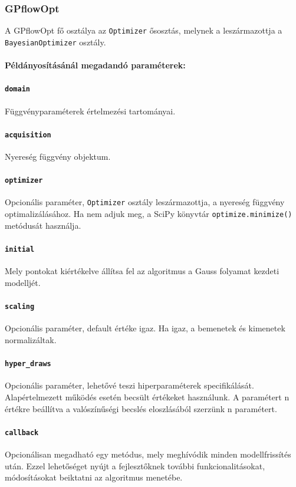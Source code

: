 \subsubsection{GPflowOpt}

A GPflowOpt fő osztálya az \texttt{Optimizer} ősosztás, melynek a leszármazottja a \texttt{BayesianOptimizer} osztály.
\paragraph{Példányosításánál megadandó paraméterek:}
\paragraph{\texttt{domain}} Függvényparaméterek értelmezési tartományai.
\paragraph{\texttt{acquisition}} Nyereség függvény objektum.
\paragraph{\texttt{optimizer}} Opcionális paraméter, \texttt{Optimizer} osztály leszármazottja, a nyereség függvény optimalizálásához. Ha nem adjuk meg, a SciPy könyvtár \texttt{optimize.minimize()} metódusát használja.
\paragraph{\texttt{initial}} Mely pontokat kiértékelve állítsa fel az algoritmus a Gauss folyamat kezdeti modelljét.
\paragraph{\texttt{scaling}} Opcionális paraméter, default értéke igaz. Ha igaz, a bemenetek és kimenetek normalizáltak.
\paragraph{\texttt{hyper\_draws}} Opcionális paraméter, lehetővé teszi hiperparaméterek specifikálását. Alapértelmezett működés esetén becsült értékeket használunk. A paramétert n értékre beállítva a valószínűségi becslés eloszlásából
szerzünk n paramétert.
\paragraph{\texttt{callback}} Opcionálisan megadható egy metódus, mely meghívódik minden modellfrissítés után. Ezzel lehetőséget nyújt a fejlesztőknek további funkcionalitásokat, módosításokat beiktatni az algoritmus menetébe.
